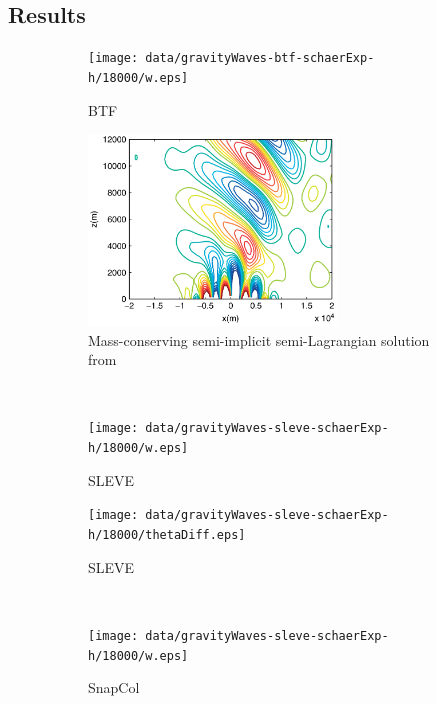 \subsection{Results}


\begin{figure}
	\centering
	\begin{subfigure}[b]{0.48\textwidth}
		\texttt{[image: data/gravityWaves-btf-schaerExp-h/18000/w.eps]}\vspace{2em}
		\caption{BTF}
		\label{fig:gw:w:btf}
	\end{subfigure}
	\hfill
	\begin{subfigure}[b]{0.48\textwidth}
		\includegraphics[height=2in]{img/melvin-7a.png}
		\caption{Mass-conserving semi-implicit semi-Lagrangian solution from \textcite{melvin2010}}
		\label{fig:gw:w:melvin}
	\end{subfigure} \\
%
	\begin{subfigure}[b]{0.48\textwidth}
		\texttt{[image: data/gravityWaves-sleve-schaerExp-h/18000/w.eps]}
		\caption{SLEVE}
		\label{fig:gw:w:sleve}
	\end{subfigure}
	\hfill
	\begin{subfigure}[b]{0.48\textwidth}
		\texttt{[image: data/gravityWaves-sleve-schaerExp-h/18000/thetaDiff.eps]}
		\caption{SLEVE}
		\label{fig:gw:thetaDiff:sleve}
	\end{subfigure} \\
%
	\begin{subfigure}[b]{0.48\textwidth}
		\texttt{[image: data/gravityWaves-sleve-schaerExp-h/18000/w.eps]}\vspace{3em}
		\caption{SnapCol}
		\label{fig:gw:w:snapCol}
	\end{subfigure}
	\hfill
	\begin{subfigure}[b]{0.48\textwidth}

\end{subfigure}
\end{figure}
